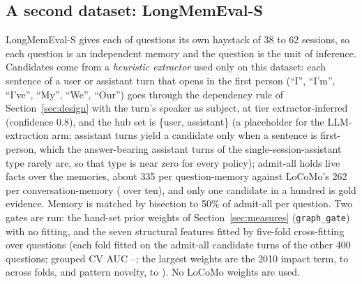 \documentclass{ceurart}
\newcommand{\code}[1]{\texttt{#1}}
\begin{document}
\subsection{A second dataset: LongMemEval-S}
\label{sec:lme}
LongMemEval-S gives each of \lmeNq{} questions its own haystack of 38 to 62 sessions, so each question is an independent memory and the question is the unit of inference. Candidates come from a \emph{heuristic extractor} used only on this dataset: each sentence of a user or assistant turn that opens in the first person (``I'', ``I'm'', ``I've'', ``My'', ``We'', ``Our'') goes through the dependency rule of Section~\ref{sec:design} with the turn's speaker as subject, at tier extractor-inferred (confidence 0.8), and the hub set is \{user, assistant\} (a placeholder for the LLM-extraction arm; assistant turns yield a candidate only when a sentence is first-person, which the answer-bearing assistant turns of the single-session-assistant type rarely are, so that type is near zero for every policy); admit-all holds \lmeLiveAdmitAll{} live facts over the \lmeNq{} memories, about 335 per question-memory against LoCoMo's 262 per conversation-memory (\liveLcAdmitAll{} over ten), and only one candidate in a hundred is gold evidence. Memory is matched by bisection to 50\% of admit-all per question. Two gates are run: the hand-set prior weights of Section~\ref{sec:measures} (\code{graph\_gate}) with no fitting, and the seven structural features fitted by five-fold cross-fitting over questions (each fold fitted on the admit-all candidate turns of the other 400 questions; grouped CV AUC \lmeCvAucMin--\lmeCvAucMax; the largest weights are the 2010 impact term, \lmeWImpactMin{} to \lmeWImpactMax{} across folds, and pattern novelty, \lmeWNoveltyMin{} to \lmeWNoveltyMax). No LoCoMo weights are used.
\end{document}
